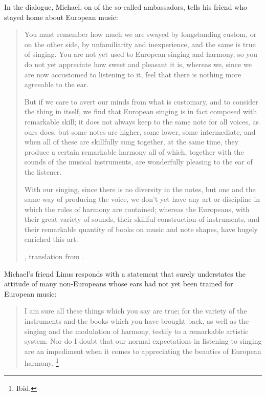 In the dialogue, Michael, on of the so-called ambassadors, tells his friend who stayed home about European music:
\begin{quotation}
  You must remember \Dots{} how much we are swayed by longstanding custom, or on the other side, by unfamiliarity and inexperience, and the same is true of singing. 
  You are not yet used to European singing and harmony, so you do not yet appreciate how sweet and pleasant it is, whereas we, since we are now accustomed to listening to it, feel that there is nothing more agreeable to the ear.

  But if we care to avert our minds from what is customary, and to consider the thing in itself, we find that European singing is in fact composed with remarkable skill; it does not always keep to the same note for all voices, as ours does, but some notes are higher, some lower, some intermediate, and when all of these are skillfully sung together, at the same time, they produce a certain remarkable harmony \Dots{} all of which, \Dots{} together with the sounds of the musical instruments, are wonderfully pleasing to the ear of the listener. \Dots{}

  With our singing, since there is no diversity in the notes, but one and the same way of producing the voice, we don't yet have any art or discipline in which the rules of harmony are contained; whereas the Europeans, with their great variety of sounds, their skillful construction of instruments, and their remarkable quantity of books on music and note shapes, have hugely enriched this art.%
  \begin{Footnote}
    \Autocite[109--110]{Sande:DeMissioneLegatorum}, translation from \autocite[155-156]{Massarella:JapaneseTravellers}.
    \end{Footnote}
\end{quotation}
Michael's friend Linus responds with a statement that surely understates the attitude of many non-Europeans whose ears had not yet been trained for European music:
\begin{quote}
  I am sure all these things which you say are true; for the variety of the instruments and the books which you have brought back, as well as the singing and the modulation of harmony, testify to a remarkable artistic system.
  Nor do I doubt that our normal expectations in listening to singing are an impediment when it comes to appreciating the beauties of European harmony.%
  \footnote{Ibid.}
\end{quote}

